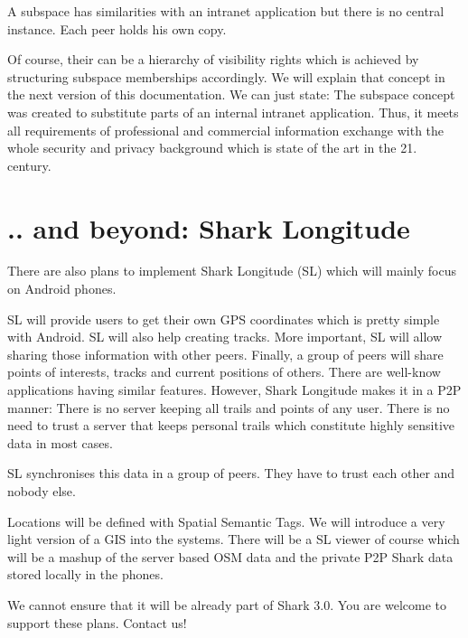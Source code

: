 A subspace has similarities with an intranet application but there is no central instance. Each peer holds his own copy.

Of course, their can be a hierarchy of visibility rights which is achieved by structuring subspace memberships accordingly. We will explain that concept in the next version of this documentation. We can just state: The subspace concept was created to substitute parts of an internal intranet application. Thus, it meets all requirements of professional and commercial information exchange with the whole security and privacy background which is state of the art in the 21. century.

\section{.. and beyond: Shark Longitude}
There are also plans to implement Shark Longitude (SL) which will mainly focus on Android phones.

SL will provide users to get their own GPS coordinates which is pretty simple with Android. SL will also help creating tracks. More important, SL will allow sharing those information with other peers. Finally, a group of peers will share points of interests, tracks and current positions of others. There are well-know
applications having similar features. However, Shark Longitude makes it in a P2P manner: There is no server keeping all trails and points of any user. There is no need to trust a server that keeps personal trails which constitute highly sensitive data in most cases.

SL synchronises this data in a group of peers. They have to trust each other and nobody else.

Locations will be defined with Spatial Semantic Tags. We will introduce a very light version of a GIS into the systems. There will be a SL viewer of course which will be a mashup of the server based OSM data and the private P2P Shark data stored locally in the phones.

We cannot ensure that it will be already part of Shark 3.0. You are welcome to support these plans. Contact us!
